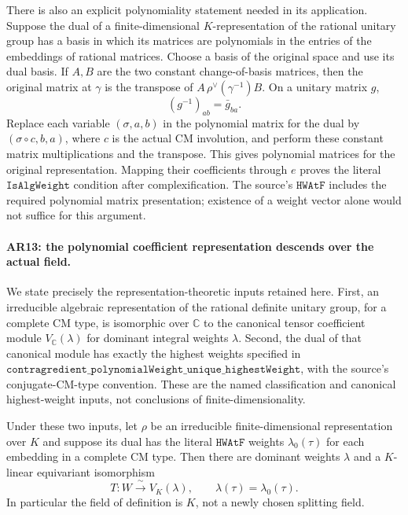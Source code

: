 There is also an explicit polynomiality statement needed in its
application. Suppose the dual of a finite-dimensional $K$-representation
of the rational unitary group has a basis in which its matrices are
polynomials in the entries of the embeddings of rational matrices.
Choose a basis of the original space and use its dual basis. If $A,B$
are the two constant change-of-basis matrices, then the original
matrix at $\gamma$ is the transpose of
$A\,\rho^\vee(\gamma^{-1})B$. On a unitary matrix $g$,
\[
 (g^{-1})_{ab}=\bar g_{ba}.
 \tag{AR.15}
\]
Replace each variable $(\sigma,a,b)$ in the polynomial matrix for
the dual by $(\sigma\circ c,b,a)$, where $c$ is the actual CM
involution, and perform these constant matrix multiplications and
the transpose. This gives polynomial matrices for the original
representation. Mapping their coefficients through $e$ proves
the literal $\texttt{IsAlgWeight}$ condition after complexification.
The source's $\texttt{HWAtF}$ includes the required polynomial
matrix presentation; existence of a weight vector alone would not
suffice for this argument.

\paragraph{AR13: the polynomial coefficient representation descends over the actual field.}
We state precisely the representation-theoretic inputs retained here.
First, an irreducible algebraic representation of the rational definite
unitary group, for a complete CM type, is isomorphic over $\mathbb C$
to the canonical tensor coefficient module $V_{\mathbb C}(\lambda)$
for dominant integral weights $\lambda$. Second, the dual of that
canonical module has exactly the highest weights specified in
$\texttt{contragredient\_polynomialWeight\_unique\_highestWeight}$,
with the source's conjugate-CM-type convention. These are the named
classification and canonical highest-weight inputs, not conclusions
of finite-dimensionality.

Under these two inputs, let $\rho$ be an irreducible finite-dimensional
representation over $K$ and suppose its dual has the literal
$\texttt{HWAtF}$ weights $\lambda_0(\tau)$ for each embedding in a
complete CM type. Then there are dominant weights $\lambda$ and
a $K$-linear equivariant isomorphism
\[
 T:W\xrightarrow{\ \sim\ }V_K(\lambda),\qquad
             \lambda(\tau)=\lambda_0(\tau).             \tag{AR.16}
\]
In particular the field of definition is $K$, not a newly chosen
splitting field.

